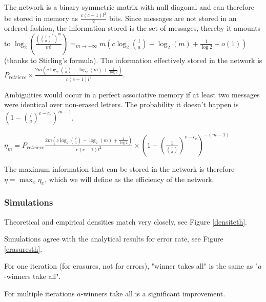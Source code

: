 \documentclass[english,11pt,twocolumn]{article}
\theoremstyle{definition}
\begin{document}
	The network is a binary symmetric matrix with null diagonal and can therefore be stored in memory as $\frac{c(c-1) l^2}{2}$ bits. Since messages are not stored in an ordered fashion, the information stored is the set of messages, thereby it amounts to $\log_2(\frac{({l \choose a}^c)^m}{m!}) \mathop{=}_{m \rightarrow +\infty} m(c \log_2{l \choose a } - \log_2(m) + \frac{1}{\log 2} + o(1)) $ (thanks to  Stirling's formula). The information effectively stored in the network is $P_{retrieve} \times  \frac{2m \left(c \log_2{l \choose a } - \log_2(m) + \frac{1}{\log 2} \right)}{c(c-1)l^2}$.
	
	Ambiguities would occur in a perfect associative memory if at least two messages were identical over non-erased letters. The probability it doesn't happen is $ (1-{l \choose a}^{c - c_e})^{m-1}$.
	
	
	$\eta_m = P_{retrieve}  \frac{2 m\left(c \log_2{l \choose a } - \log_2(m) + \frac{1}{\log 2} \right)}{c(c-1)l^2} \times (1-(\frac{1}{{l \choose a}})^{c - c_e})^{-(m-1)}$
	
	The maximum information that can be stored in the network is therefore $\eta = \max_x \eta_x $, which we will define as the efficiency of the network.
	
	\subsubsection{Simulations}
		Theoretical and empirical densities match very closely, see Figure \ref{densiteth}. %
		
		
		
		Simulations agree with the analytical results for error rate, see Figure \ref{erasuresth}.
	

	For one iteration (for erasures, not for errors), "winner takes all" is the same as "$a$-winners take all".
	
	For multiple iterations $a$-winners take all is a significant improvement.
	
	
\end{document}
